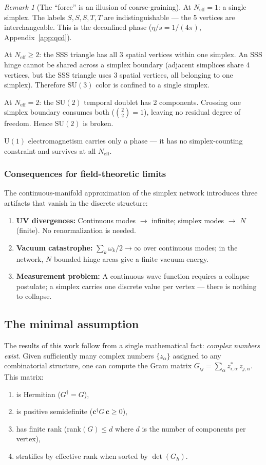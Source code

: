 \documentclass[12pt]{article}
\theoremstyle{remark}
\newtheorem{remark}[theorem]{Remark}
\theoremstyle{definition}
\begin{document}
\begin{remark}[The ``force'' is an illusion of coarse-graining]
At $N_\text{eff} = 1$: a single simplex. The labels $S, S, S, T, T$ are indistinguishable --- the 5 vertices are interchangeable. This is the deconfined phase ($\eta/s = 1/(4\pi)$, Appendix~\ref{app:qcd}).

At $N_\text{eff} \geq 2$: the SSS triangle has all 3 spatial vertices within one simplex. An SSS hinge cannot be shared across a simplex boundary (adjacent simplices share 4 vertices, but the SSS triangle uses 3 spatial vertices, all belonging to one simplex). Therefore $\text{SU}(3)$ color is confined to a single simplex.

At $N_\text{eff} = 2$: the $\text{SU}(2)$ temporal doublet has 2 components. Crossing one simplex boundary consumes both ($\binom{2}{2} = 1$), leaving no residual degree of freedom. Hence $\text{SU}(2)$ is broken.

$\text{U}(1)$ electromagnetism carries only a phase --- it has no simplex-counting constraint and survives at all $N_\text{eff}$.

\subsubsection{Consequences for field-theoretic limits}

The continuous-manifold approximation of the simplex network introduces three artifacts that vanish in the discrete structure:

\begin{enumerate}
\item \textbf{UV divergences:} Continuous modes $\to$ infinite; simplex modes $\to$ $N$ (finite). No renormalization is needed.
\item \textbf{Vacuum catastrophe:} $\sum_k \omega_k/2 \to \infty$ over continuous modes; in the network, $N$ bounded hinge areas give a finite vacuum energy.
\item \textbf{Measurement problem:} A continuous wave function requires a collapse postulate; a simplex carries one discrete value per vertex --- there is nothing to collapse.
\end{enumerate}

\subsection{The minimal assumption}

The results of this work follow from a single mathematical fact: \emph{complex numbers exist}. Given sufficiently many complex numbers $\{z_\alpha\}$ assigned to any combinatorial structure, one can compute the Gram matrix $G_{ij} = \sum_\alpha z^*_{i,\alpha}\,z_{j,\alpha}$. This matrix:
\begin{enumerate}
\item is Hermitian ($G^\dagger = G$),
\item is positive semidefinite ($\mathbf{c}^\dagger G\,\mathbf{c} \geq 0$),
\item has finite rank ($\text{rank}(G) \leq d$ where $d$ is the number of components per vertex),
\item stratifies by effective rank when sorted by $\det(G_h)$.
\end{enumerate}


\end{remark}
\end{document}
